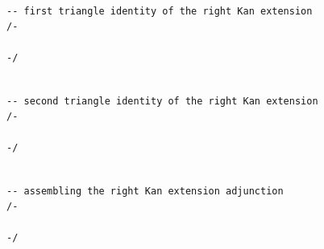 \documentclass{book}
\theoremstyle{definition}
\newcounter{lcounter}
\begin{document}
{{\begin{center}
\begin{tcolorbox}[width=5in,colback={white},title={\begin{center}\texttt{Lean \thelcounter} \addtocounter{lcounter}{1}  \end{center}},colbacktitle=Blue,coltitle=black]
\begin{verbatim}
\end{verbatim}
\end{tcolorbox}
\end{center}

\begin{center}
\begin{tcolorbox}[width=5in,colback={white},title={\begin{center}\texttt{Lean \thelcounter} \addtocounter{lcounter}{1}  \end{center}},colbacktitle=Blue,coltitle=black]
\begin{verbatim}

-- first triangle identity of the right Kan extension
/-

-/

\end{verbatim}
\end{tcolorbox}
\end{center}

\begin{center}
\begin{tcolorbox}[width=5in,colback={white},title={\begin{center}\texttt{Lean \thelcounter} \addtocounter{lcounter}{1}  \end{center}},colbacktitle=Blue,coltitle=black]
\begin{verbatim}

-- second triangle identity of the right Kan extension
/-

-/

\end{verbatim}
\end{tcolorbox}
\end{center}

\begin{center}
\begin{tcolorbox}[width=5in,colback={white},title={\begin{center}\texttt{Lean \thelcounter} \addtocounter{lcounter}{1}  \end{center}},colbacktitle=Blue,coltitle=black]
\begin{verbatim}

-- assembling the right Kan extension adjunction
/-

-/


\end{verbatim}
\end{tcolorbox}
\end{center}}}
\end{document}
